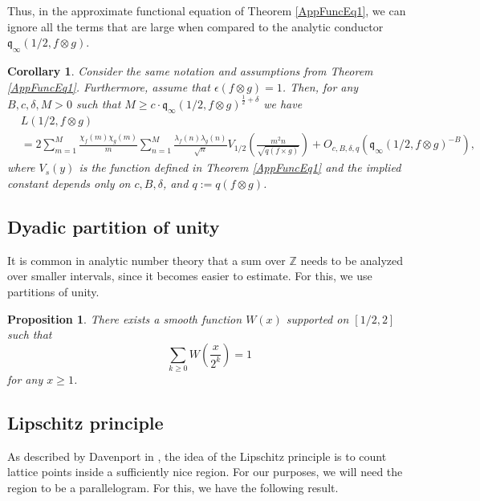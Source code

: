 \documentclass[11pt]{amsart}
\newcommand{\Z}{\mathbb{Z}}
\newcommand{\q}{\mathfrak{q}}
\newtheorem{proposition}[theorem]{Proposition}
\newtheorem{corollary}[theorem]{Corollary}
\theoremstyle{definition}
\theoremstyle{remark}
\begin{document}
Thus, in the approximate functional equation of Theorem \ref{AppFuncEq1}, we can ignore all the terms that are large when compared to the analytic conductor $\q_{\infty}(1/2,f\otimes g)$.

\begin{corollary}\label{AppFuncEq2}
Consider the same notation and assumptions from Theorem \ref{AppFuncEq1}. Furthermore, assume that $\epsilon(f\otimes g) = 1$. Then, for any $B,c,\delta,M>0$ such that $M \geq c\cdot \q_{\infty}(1/2,f\otimes g)^{\frac{1}{2}+\delta}$ we have 
\begin{align*}
    &L(1/2, f\otimes g) \\
    &= 2 \sum_{m=1}^{M} \frac{\chi_f(m) \chi_g(m)}{m} \sum_{n=1}^{M} \frac{\lambda_f(n) \lambda_g(n)}{\sqrt{n}} V_{1/2} \left( \frac{m^2 n}{\sqrt{q(f\times g)}} \right) + O_{c,B,\delta,q}\left(\q_{\infty}(1/2,f\otimes g)^{-B}\right),
\end{align*} 
where $V_s(y)$ is the function defined in Theorem \ref{AppFuncEq1} and the implied constant depends only on $c,B,\delta$, and $q:=q(f\otimes g)$.
\end{corollary}




\subsection{Dyadic partition of unity}

It is common in analytic number theory that a sum over $\Z$ needs to be analyzed over smaller intervals, since it becomes easier to estimate. For this, we use partitions of unity.

\begin{proposition}\label{PartitionUnity}
There exists a smooth function $W(x)$ supported on $[1/2,2]$ such that $$ \sum_{k\geq 0} W\left( \frac{x}{2^k} \right) = 1 $$ for any $x\geq 1$.
\end{proposition}




\subsection{Lipschitz principle}

As described by Davenport in \cite{Davenport-LipschitzPrin}, the idea of the Lipschitz principle is to count lattice points inside a sufficiently nice region. For our purposes, we will need the region to be a parallelogram. For this, we have the following result.
\end{document}
